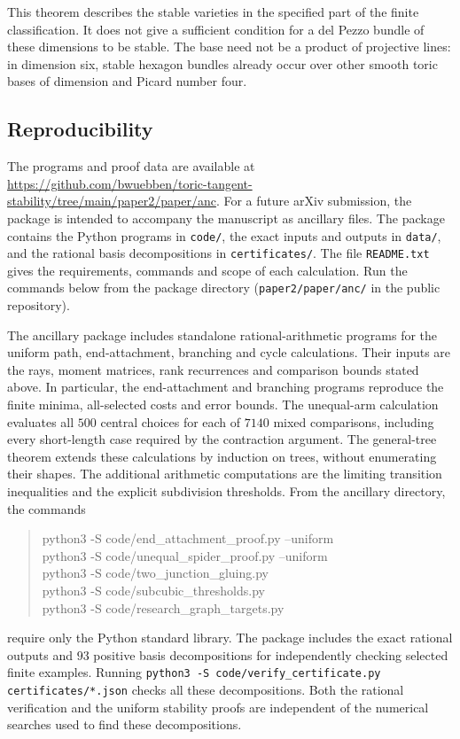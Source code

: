 This theorem describes the stable varieties in the specified part of the
finite classification. It does not give a sufficient condition for a del
Pezzo bundle of these dimensions to be stable. The base need not be a
product of projective lines: in dimension six, stable hexagon bundles
already occur over other smooth toric bases of dimension and Picard
number four.

\subsection{Reproducibility}

The programs and proof data are available at
\url{https://github.com/bwuebben/toric-tangent-stability/tree/main/paper2/paper/anc}.
For a future arXiv submission, the package is intended to accompany the
manuscript as ancillary files. The package contains the Python programs in
\texttt{code/}, the exact inputs and outputs in \texttt{data/}, and the
rational basis decompositions in \texttt{certificates/}.
The file \texttt{README.txt} gives the requirements, commands and scope of
each calculation. Run the commands below from the package directory
(\texttt{paper2/paper/anc/} in the public repository).

The ancillary package includes standalone rational-arithmetic programs
for the uniform path, end-attachment, branching and cycle
calculations. Their inputs are the rays, moment matrices, rank recurrences
and comparison bounds stated above. In particular, the end-attachment
and branching programs reproduce the finite minima, all-selected costs
and error bounds. The unequal-arm calculation evaluates all $500$
central choices for each of $7140$ mixed comparisons, including every
short-length case required by the contraction argument. The general-tree
theorem extends these calculations by induction on trees, without
enumerating their shapes. The additional arithmetic computations are the limiting transition inequalities and the explicit
subdivision thresholds. From the ancillary directory, the commands
\begin{quote}
\small\ttfamily\raggedright
python3 -S code/end\_attachment\_proof.py --uniform\\
python3 -S code/unequal\_spider\_proof.py --uniform\\
python3 -S code/two\_junction\_gluing.py\\
python3 -S code/subcubic\_thresholds.py\\
python3 -S code/research\_graph\_targets.py
\end{quote}
require only the Python standard library. The package includes the exact
rational outputs and $93$ positive basis decompositions for independently
checking selected finite examples. Running
\texttt{python3 -S code/verify\_certificate.py certificates/*.json}
checks all these decompositions. Both the rational verification and the
uniform stability proofs are independent of the numerical searches used
to find these decompositions.

